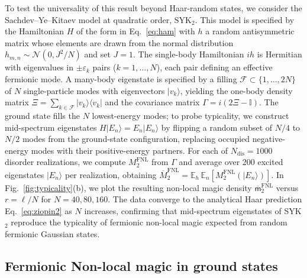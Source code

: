 \documentclass[prx,twocolumn,superscriptaddress,aps,10pt, frontmatterverbose, reprint,footinbib,longbibliography=true]{revtex4-2}
\begin{document}
To test the universality of this result beyond Haar-random states, we consider the Sachdev--Ye--Kitaev model at quadratic order, $\mathrm{SYK}_2$.
This model is specified by the  Hamiltonian  $H$ of the form in  Eq.~\eqref{eq:ham} with  $h$ a random antisymmetric matrix whose elements are drawn from the normal distribution $h_{m,n}\sim \mathcal{N}(0,{J^2}/{N})$ and set $J=1$. 
The single-body Hamiltonian $ih$ is Hermitian with eigenvalues in $\pm\varepsilon_k$ pairs ($k=1,\dots,N$), each pair defining an effective fermionic mode. A many-body eigenstate is specified by a filling $\mathcal{F}\subset\{1,\dots,2N\}$ of $N$ single-particle modes with eigenvectors $|v_k\rangle$, yielding the one-body density matrix $\Xi=\sum_{k\in\mathcal{F}}|v_k\rangle\langle v_k|$ and the covariance matrix $\Gamma = i(2\Xi-\mathbb{I})$. 
The ground state fills the $N$ lowest-energy modes; to probe typicality, we construct mid-spectrum eigenstates $H|E_n\rangle=E_n|E_n\rangle$  by flipping a random subset of $N/4$ to $N/2$ modes from the ground-state configuration, replacing occupied negative-energy modes with their positive-energy partners. For each of $N_{\mathrm{dis}}=1000$ disorder realizations, we compute $M_2^{\mathrm{FNL}}$ from $\Gamma$ and average over 200 excited eigenstates $|E_n\rangle$ per realization, obtaining $\overline{M}_2^{\mathrm{FNL}}=\mathbb{E}_{h}\,\mathbb{E}_{n}[M_2^{\mathrm{FNL}}(|E_n\rangle)]$.
In Fig.~\ref{fig:typicality}(b), we plot the resulting non-local magic density $\overline{\mathsf{m}}_2^\mathrm{FNL}$ versus $r=\ell/N$ for $N=40,80,160$.
The data converge to the analytical Haar prediction Eq.~\eqref{eq:ziopin2} as $N$ increases, confirming that mid-spectrum eigenstates of SYK$_2$ reproduce the typicality of fermionic non-local magic expected from random fermionic Gaussian states.



\subsection{Fermionic Non-local magic in ground states}
\end{document}
